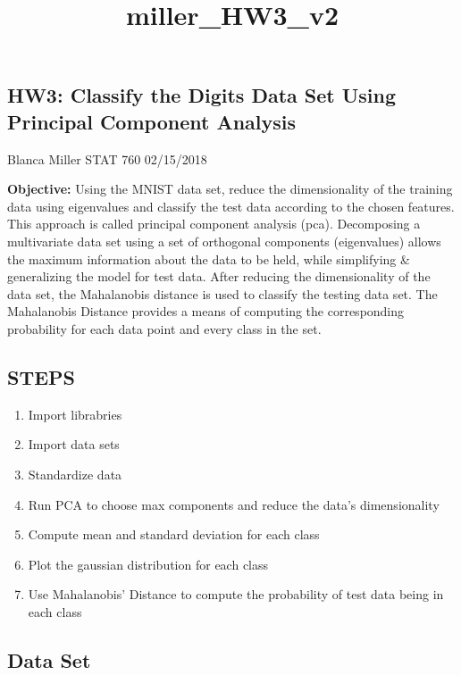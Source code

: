 \documentclass[11pt]{article}
\title{miller\_HW3\_v2}
\providecommand{\tightlist}{%
      \setlength{\itemsep}{0pt}\setlength{\parskip}{0pt}}
\begin{document}
    
    
    \maketitle
    
    

    
    \subsection{HW3: Classify the Digits Data Set Using Principal Component
Analysis}\label{hw3-classify-the-digits-data-set-using-principal-component-analysis}

    Blanca Miller STAT 760 02/15/2018

\textbf{Objective:} Using the MNIST data set, reduce the dimensionality
of the training data using eigenvalues and classify the test data
according to the chosen features. This approach is called principal
component analysis (pca). Decomposing a multivariate data set using a
set of orthogonal components (eigenvalues) allows the maximum
information about the data to be held, while simplifying \& generalizing
the model for test data. After reducing the dimensionality of the data
set, the Mahalanobis distance is used to classify the testing data set.
The Mahalanobis Distance provides a means of computing the corresponding
probability for each data point and every class in the set.

    \subsection{STEPS}\label{steps}

\begin{enumerate}
\def\labelenumi{\arabic{enumi}.}
\tightlist
\item
  Import librabries
\item
  Import data sets
\item
  Standardize data
\item
  Run PCA to choose max components and reduce the data's dimensionality
\item
  Compute mean and standard deviation for each class
\item
  Plot the gaussian distribution for each class
\item
  Use Mahalanobis' Distance to compute the probability of test data
  being in each class
\end{enumerate}

    \subsection{Data Set}\label{data-set}
\end{document}
